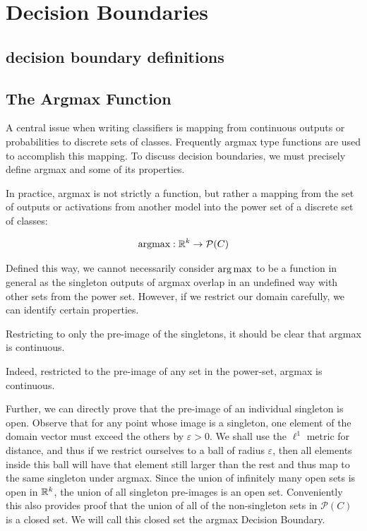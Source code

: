 \chapter{Decision Boundaries}

\label{Chapter5} %

\section{decision boundary definitions} 
\section{The Argmax Function}

A central issue when writing classifiers is mapping from continuous outputs or probabilities to discrete sets of classes. Frequently argmax type functions are used to accomplish this mapping. To discuss decision boundaries, we must precisely define argmax and some of its properties. 

In practice, argmax is not strictly a function, but rather a mapping from the set of outputs or activations from another model into the power set of a discrete set of classes:

\begin{equation}
    \text{argmax} : \mathbb{R}^k \to \mathcal{P}(C)
\end{equation}

Defined this way, we cannot necessarily consider $\operatorname*{arg\,max}$ to be a function in general as the singleton outputs of argmax overlap in an undefined way with other sets from the power set. However, if we restrict our domain carefully, we can identify certain properties. 

Restricting to only the pre-image of the singletons, it should be clear that argmax is continuous. 

Indeed, restricted to the pre-image of any set in the power-set, argmax is continuous. 

Further, we can directly prove that the pre-image of an individual singleton is open. Observe that for any point whose image is a singleton, one element of the domain vector must exceed the others by $\varepsilon > 0$. We shall use the $\ell^1$ metric for distance, and thus if we restrict ourselves to a ball of radius $\varepsilon$, then all elements inside this ball will have that element still larger than the rest and thus map to the same singleton under argmax. Since the union of infinitely many open sets is open in $\mathbb{R}^k$, the union of all singleton pre-images is an open set. Conveniently this also provides proof that the union of all of the non-singleton sets in $\mathcal{P}(C)$ is a closed set. We will call this closed set the argmax Decision Boundary. 

